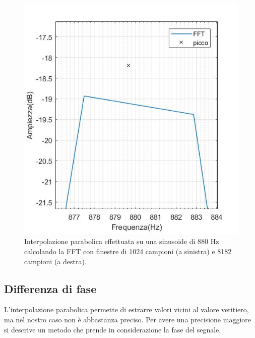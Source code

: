 \documentclass[12pt]{report}
\begin{document}
\begin{figure}[htbp]
\begin{minipage}[c]{.40\textwidth}
		\includegraphics[width= 1.2 \textwidth]{img/8192peak_parab} 
	\end{minipage} 
	\caption{Interpolazione parabolica effettuata su una sinusoide di 880 Hz calcolando la FFT con finestre di 1024 campioni (a sinistra) e 8182 campioni (a destra).}
	\label{fig:peak_parab}
\end{figure} 

		\subsection{Differenza di fase}
		\label{cap3sec2_2}
			L'interpolazione parabolica permette di estrarre valori vicini al valore veritiero, ma nel nostro caso non è abbastanza preciso. Per avere una precisione maggiore si descrive un metodo che prende in considerazione la fase del segnale.\\
			
\end{document}
